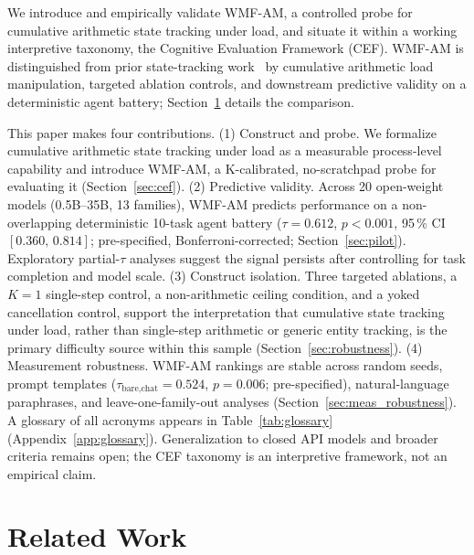 \documentclass{article}
\begin{document}
We introduce and empirically validate WMF-AM, a controlled probe for
cumulative arithmetic state tracking under load, and situate it within
a working interpretive taxonomy, the Cognitive Evaluation Framework (CEF).
WMF-AM is distinguished from prior state-tracking
work~\citep{entitytracking2023,huang2025language,xia2025minerva} by
cumulative arithmetic load manipulation, targeted ablation controls,
and downstream predictive validity on a deterministic agent battery;
Section~\ref{sec:related} details the comparison.

This paper makes four contributions.
%
(1) Construct and probe.
We formalize cumulative arithmetic state tracking under load as a
measurable process-level capability and introduce WMF-AM, a
K-calibrated, no-scratchpad probe for evaluating it
(Section~\ref{sec:cef}).
%
(2) Predictive validity.
Across 20 open-weight models (0.5B--35B, 13 families), WMF-AM
predicts performance on a non-overlapping deterministic 10-task agent
battery ($\tau{=}0.612$, $p{<}0.001$, 95\,\% CI
$[0.360,\,0.814]$; pre-specified, Bonferroni-corrected;
Section~\ref{sec:pilot}).
Exploratory partial-$\tau$ analyses suggest the signal persists
after controlling for task completion and model scale.
%
(3) Construct isolation.
Three targeted ablations, a $K{=}1$ single-step control, a
non-arithmetic ceiling condition, and a yoked cancellation
control, support the interpretation that cumulative state tracking under load, rather
than single-step arithmetic or generic entity tracking, is the
primary difficulty source within this sample (Section~\ref{sec:robustness}).
%
(4) Measurement robustness.
WMF-AM rankings are stable across random seeds, prompt templates
($\tau_{\text{bare,chat}}{=}0.524$, $p{=}0.006$; pre-specified),
natural-language paraphrases, and leave-one-family-out analyses
(Section~\ref{sec:meas_robustness}).
%
\noindent A glossary of all acronyms appears in
Table~\ref{tab:glossary} (Appendix~\ref{app:glossary}).
Generalization to closed API models and broader criteria remains open;
the CEF taxonomy is an interpretive framework, not an empirical claim.
\section{Related Work}
\label{sec:related}
\end{document}
